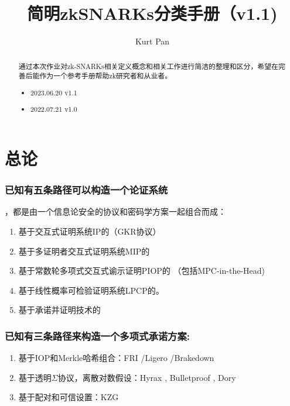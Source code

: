 \documentclass[runningheads]{llncs}
\begin{document}
\title{简明zkSNARKs分类手册（v1.1)}
\author{Kurt Pan}
\maketitle

\begin{abstract}
通过本次作业对zk-SNARKs相关定义概念和相关工作进行简洁的整理和区分，希望在完善后能作为一个参考手册帮助zk研究者和从业者。

\begin{itemize}
  \item 2023.06.20 v1.1
  \item 2022.07.21 v1.0
\end{itemize}



\end{abstract}

\setcounter{tocdepth}{2}
\tableofcontents



\section{总论}



\subsubsection*{已知有五条路径可以构造一个论证系统}，都是由一个信息论安全的协议和密码学方案一起组合而成：
\begin{enumerate}
  \item 基于交互式证明系统IP的（GKR协议）
  \item 基于多证明者交互式证明系统MIP的
  \item 基于常数轮多项式交互式谕示证明PIOP的 （包括MPC-in-the-Head)
  \item 基于线性概率可检验证明系统LPCP的。
  \item 基于承诺并证明技术的
\end{enumerate}


\subsubsection*{已知有三条路径来构造一个多项式承诺方案:}
\begin{enumerate}
  \item 基于IOP和Merkle哈希组合：FRI \cite{BBH17} /Ligero \cite{AHI17} /Brakedown \cite{GLS21}
  \item 基于透明$\Sigma$协议，离散对数假设：Hyrax \cite{WTS18}, Bulletproof \cite{BBB18}, Dory
  \item 基于配对和可信设置：KZG \cite{KZG10}
  
\end{enumerate}
\end{document}
